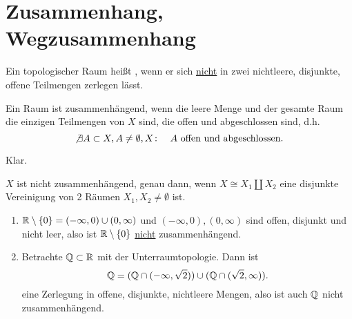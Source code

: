 
\section{Zusammenhang, Wegzusammenhang}

\begin{definition}[Zusammenhang]\label{def:zusammenhang}
    Ein topologischer Raum heißt , wenn er sich \underline{nicht} in zwei nichtleere, disjunkte, offene Teilmengen zerlegen lässt. 
\end{definition}

\begin{dlemma}\label{lm:raum-ist-zusammenhängend-gdw-offen-abgeschlossene-mengen-sind-trivial}
    Ein Raum ist zusammenhängend, wenn die leere Menge und der gesamte Raum die einzigen Teilmengen von $X$ sind, die offen und abgeschlossen sind, d.h.
     \[
    \not \exists  A\subset X, A\neq \emptyset,X \colon \quad A \text{ offen und abgeschlossen}
    .\] 
\end{dlemma}

\begin{proof*}
    Klar.
\end{proof*}

\begin{remark}
    $X$ ist nicht zusammenhängend, genau dann, wenn  $X \cong X_1 \coprod X_2$ eine disjunkte Vereinigung von 2 Räumen $X_1,X_2\neq \emptyset$ ist.
\end{remark}

\begin{example}
    \begin{enumerate}[1)]
        \item $\mathbb{R}\setminus \left \{0\right\}  = (-\infty,0) \cup (0,\infty)$ und $(-\infty,0),(0,\infty)$ sind offen, disjunkt und nicht leer, also ist $\mathbb{R}\setminus \left \{0\right\} $ \underline{nicht} zusammenhängend. 
        \item Betrachte $\mathbb{Q}\subset \mathbb{R}$ mit der Unterraumtopologie. Dann ist
            \[
                \mathbb{Q} = (\mathbb{Q} \cap (-\infty,\sqrt{2})) \cup (\mathbb{Q} \cap (\sqrt{2},\infty))  
            .\] 
            eine Zerlegung in offene, disjunkte, nichtleere Mengen, also ist auch $\mathbb{Q}$ nicht zusammenhängend.
    \end{enumerate}
\end{example}

